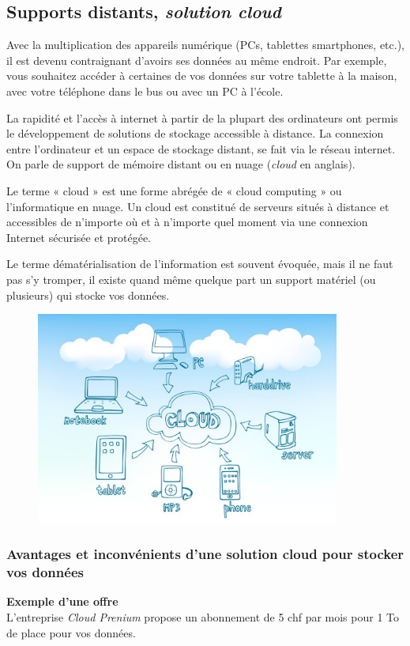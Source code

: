 \subsection{Supports distants, \textit{solution cloud}}
Avec la multiplication des appareils numérique (PCs, tablettes smartphones, etc.), il est devenu contraignant d'avoirs ses données au même endroit. Par exemple, vous souhaitez accéder à certaines de vos données sur votre tablette à la maison, avec votre téléphone dans le bus ou avec un PC à l'école. 

La rapidité et l'accès à internet à partir de la plupart des ordinateurs ont permis le développement de solutions de stockage accessible à distance. La connexion entre l'ordinateur et un espace de stockage distant, se fait via le réseau internet. On parle de support de mémoire distant ou en nuage (\textit{cloud} en anglais).

\begin{myremarques}
	\item Le terme « cloud » est une forme abrégée de « cloud computing » ou l’informatique en nuage. Un cloud est constitué de serveurs situés à distance et accessibles de n’importe où et à n’importe quel moment via une connexion Internet sécurisée et protégée.
	\item Le terme dématérialisation de l'information est souvent évoquée, mais il ne faut pas s'y tromper, il existe quand même quelque part un support matériel (ou plusieurs) qui stocke vos données. 
\end{myremarques}

\begin{figure}[ht!]
	\centering
	\includegraphics[width=10cm]{Images/stockage/cloud_storage.jpg}
	
\end{figure}

\subsubsection{Avantages et inconvénients d'une solution cloud pour stocker vos données}
\textbf{Exemple d'une offre}\\ L’entreprise \textit{Cloud Prenium} propose un abonnement de 5 chf par mois pour 1 To de place pour vos données. 

